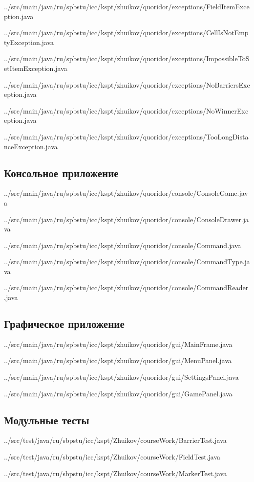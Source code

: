 \documentclass[a4paper]{article}
\begin{document}

{../src/main/java/ru/spbstu/icc/kspt/zhuikov/quoridor/exceptions/FieldItemException.java}


{../src/main/java/ru/spbstu/icc/kspt/zhuikov/quoridor/exceptions/CellIsNotEmptyException.java}


{../src/main/java/ru/spbstu/icc/kspt/zhuikov/quoridor/exceptions/ImpossibleToSetItemException.java}


{../src/main/java/ru/spbstu/icc/kspt/zhuikov/quoridor/exceptions/NoBarriersException.java}


{../src/main/java/ru/spbstu/icc/kspt/zhuikov/quoridor/exceptions/NoWinnerException.java}


{../src/main/java/ru/spbstu/icc/kspt/zhuikov/quoridor/exceptions/TooLongDistanceException.java}
\newpage

\subsection{Консольное приложение}


{../src/main/java/ru/spbstu/icc/kspt/zhuikov/quoridor/console/ConsoleGame.java}
\newpage


{../src/main/java/ru/spbstu/icc/kspt/zhuikov/quoridor/console/ConsoleDrawer.java}
\newpage


{../src/main/java/ru/spbstu/icc/kspt/zhuikov/quoridor/console/Command.java}


{../src/main/java/ru/spbstu/icc/kspt/zhuikov/quoridor/console/CommandType.java}
\newpage


{../src/main/java/ru/spbstu/icc/kspt/zhuikov/quoridor/console/CommandReader.java}
\newpage

\subsection{Графическое приложение}


{../src/main/java/ru/spbstu/icc/kspt/zhuikov/quoridor/gui/MainFrame.java}
\newpage


{../src/main/java/ru/spbstu/icc/kspt/zhuikov/quoridor/gui/MenuPanel.java}
\newpage


{../src/main/java/ru/spbstu/icc/kspt/zhuikov/quoridor/gui/SettingsPanel.java}
\newpage


{../src/main/java/ru/spbstu/icc/kspt/zhuikov/quoridor/gui/GamePanel.java}
\newpage

\subsection{Модульные тесты}


{../src/test/java/ru/sbpstu/icc/kspt/Zhuikov/courseWork/BarrierTest.java}
\newpage


{../src/test/java/ru/sbpstu/icc/kspt/Zhuikov/courseWork/FieldTest.java}
\newpage


{../src/test/java/ru/sbpstu/icc/kspt/Zhuikov/courseWork/MarkerTest.java}
\newpage
\end{document}
